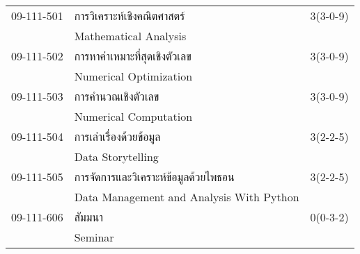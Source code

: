 \begin{longtable}{p{}p{}r{}}
09-111-501 & การวิเคราะห์เชิงคณิตศาสตร์ & 3(3-0-9)\\
 & Mathematical Analysis & \\[3mm]
09-111-502 & การหาค่าเหมาะที่สุดเชิงตัวเลข & 3(3-0-9)\\
 & Numerical Optimization & \\[3mm]
09-111-503 & การคำนวณเชิงตัวเลข & 3(3-0-9)\\
 & Numerical Computation & \\[3mm]
09-111-504 & การเล่าเรื่องด้วยข้อมูล & 3(2-2-5)\\
 & Data Storytelling & \\[3mm]
09-111-505 & การจัดการและวิเคราะห์ข้อมูลด้วยไพธอน & 3(2-2-5)\\
 & Data Management and Analysis With Python & \\[3mm]
09-111-606 & สัมมนา & 0(0-3-2)\\
 & Seminar & \\[3mm]
\end{longtable}
